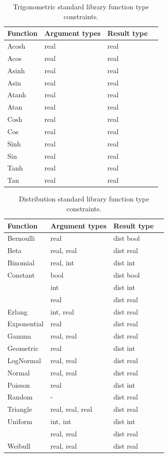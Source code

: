 {\begin{table}
  \centering
  \begin{tabular}{l l l l}
    \textbf{Function} & \textbf{Argument types} & \textbf{Result type} \\
    \hline
    Acosh & real & real \\
    Acos & real & real \\
    Asinh & real & real \\
    Asin & real & real \\
    Atanh & real & real \\
    Atan & real & real \\
    Cosh & real & real \\
    Cos & real & real \\
    Sinh & real & real \\
    Sin & real & real \\
    Tanh & real & real \\
    Tan & real & real \\
    \hline
  \end{tabular}
  \caption{Trigonometric standard library function type constraints.}
  \label{tbl:stdlib-trig-types}
\end{table}

\begin{table}
  \centering
  \begin{tabular}{l l l l}
    \textbf{Function} & \textbf{Argument types} & \textbf{Result type} \\
    \hline
    Bernoulli & real & dist bool \\
    Beta & real, real & dist real \\
    Binomial & real, int & dist int \\
    Constant & bool & dist bool \\
             & int & dist int \\
             & real & dist real \\
    Erlang & int, real & dist real \\
    Exponential & real & dist real \\
    Gamma & real, real & dist real \\
    Geometric & real & dist int \\
    LogNormal & real, real & dist real \\
    Normal & real, real & dist real \\
    Poisson & real & dist int \\
    Random & - & dist real \\
    Triangle & real, real, real & dist real \\
    Uniform & int, int & dist int \\
            & real, real & dist real \\
    Weibull & real, real & dist real \\
  \end{tabular}
  \caption{Distribution standard library function type constraints.}
  \label{tbl:stdlib-dist-types}
\end{table}
}

